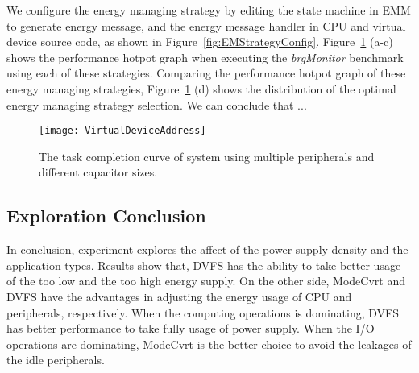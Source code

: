 We configure the energy managing strategy by editing the state machine in EMM to generate energy message, and the energy message handler in CPU and virtual device source code, as shown in Figure~\ref{fig:EMStrategyConfig}.
Figure~\ref{fig:HotpotGraph} (a-c) shows the performance hotpot graph when executing the \emph{brgMonitor} benchmark using each of these strategies.
Comparing the performance hotpot graph of these energy managing strategies, Figure~\ref{fig:HotpotGraph} (d) shows the distribution of the optimal energy managing strategy selection.
We can conclude that ...  

\begin{figure}[!htpb]
	\centering
	\vspace{-5pt}
	\texttt{[image: VirtualDeviceAddress]}
	\vspace{-5pt}
	\caption{The task completion curve of system using multiple peripherals and different capacitor sizes.}	\label{fig:HotpotGraph}
\end{figure}

\subsection{Exploration Conclusion}	\label{sec:exp-sum}
%
In conclusion, experiment explores the affect of the power supply density and the application types. 
Results show that, DVFS has the ability to take better usage of the too low and the too high energy supply.
On the other side, ModeCvrt and DVFS have the advantages in adjusting the energy usage of CPU and peripherals, respectively.
When the computing operations is dominating, DVFS has better performance to take fully usage of power supply.
When the I/O operations are dominating, ModeCvrt is the better choice to avoid the leakages of the idle peripherals.

\begin{comment}

 
\end{comment}